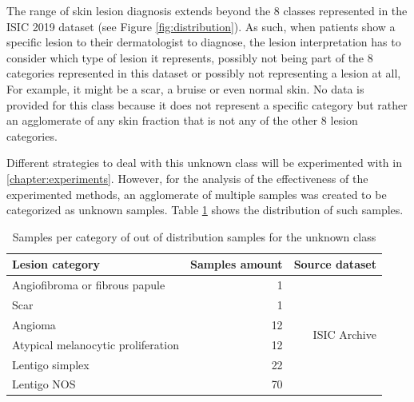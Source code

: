     The range of skin lesion diagnosis extends beyond the 8 classes represented in the ISIC 2019 dataset (see Figure \ref{fig:distribution}). As such, when patients show a specific lesion to their dermatologist to diagnose, the lesion interpretation has to consider which type of lesion it represents, possibly not being part of the 8 categories represented in this dataset or possibly not representing a lesion at all, For example, it might be a scar, a bruise or even normal skin. No data is provided for this class because it does not represent a specific category but rather an agglomerate of any skin fraction that is not any of the other 8 lesion categories. \par 
    
    Different strategies to deal with this unknown class will be experimented with in \autoref{chapter:experiments}. However, for the analysis of the effectiveness of the experimented methods, an agglomerate of multiple samples was created to be categorized as unknown samples. Table \ref{tables:out_dist_dataset} shows the distribution of such samples. \par 
    
    \begin{table}[h]
        \centering
        \begin{tabular}{|l|r|r|}
            \hline
            \textbf{Lesion category}           & \multicolumn{1}{l|}{\textbf{Samples amount}} & \multicolumn{1}{l|}{\textbf{Source dataset}} \\ \hline
            Angiofibroma or fibrous papule     & 1                                            & \multirow{6}{*}{ISIC Archive}                \\ \cline{1-2}
            Scar                               & 1                                            &                                              \\ \cline{1-2}
            Angioma                            & 12                                           &                                              \\ \cline{1-2}
            Atypical melanocytic proliferation & 12                                           &                                              \\ \cline{1-2}
            Lentigo simplex                    & 22                                           &                                              \\ \cline{1-2}
            Lentigo NOS                        & 70                                           &                                              \\ \hline
        \end{tabular}
        \caption{Samples per category of out of distribution samples for the unknown class}
        \label{tables:out_dist_dataset}
    \end{table}
    
